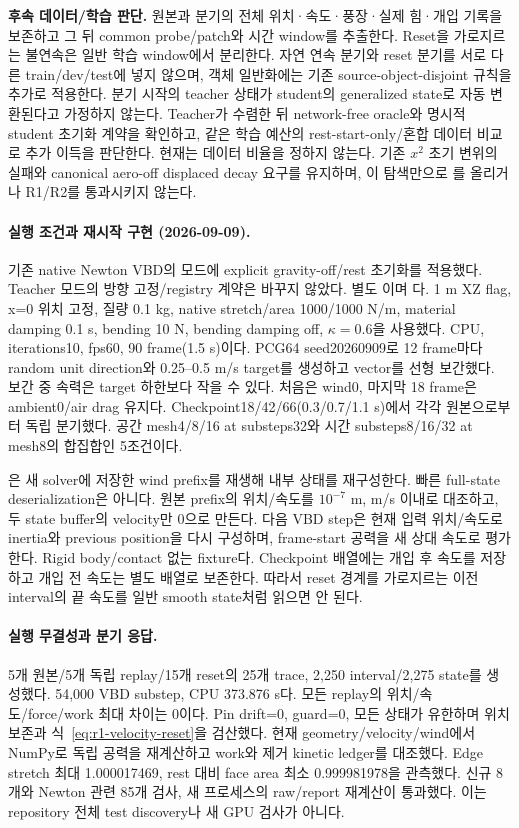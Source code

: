 \documentclass[10pt]{article}
\begin{document}
\textbf{후속 데이터/학습 판단.} 원본과 분기의 전체 위치·속도·풍장·실제 힘·개입 기록을 보존하고
그 뒤 common probe/patch와 시간 window를 추출한다. Reset을 가로지르는 불연속은 일반 학습 window에서
분리한다. 자연 연속 분기와 reset 분기를 서로 다른 train/dev/test에 넣지 않으며,
객체 일반화에는 기존 source-object-disjoint 규칙을 추가로 적용한다.
분기 시작의 teacher 상태가 student의 generalized state로 자동 변환된다고 가정하지 않는다.
Teacher가 수렴한 뒤 network-free oracle와 명시적 student 초기화 계약을 확인하고,
같은 학습 예산의 rest-start-only/혼합 데이터 비교로 추가 이득을 판단한다. 현재는 데이터 비율을 정하지 않는다.
기존 \(x^2\) 초기 변위의 실패와 canonical aero-off displaced decay 요구를 유지하며,
이 탐색만으로 를 올리거나 R1/R2를 통과시키지 않는다.


\paragraph{실행 조건과 재시작 구현 (2026-09-09).}
기존 native Newton VBD의  모드에 explicit gravity-off/rest 초기화를 적용했다.
Teacher 모드의 방향 고정/registry 계약은 바꾸지 않았다. 별도
이며 다.
1 m XZ flag, x=0 위치 고정, 질량 0.1 kg, native stretch/area 1000/1000 N/m,
material damping 0.1 s, bending 10 N, bending damping off, \(\kappa=0.6\)을 사용했다.
CPU, iterations10, fps60, 90 frame(1.5 s)이다. PCG64 seed20260909로 12 frame마다
random unit direction와 0.25--0.5 m/s target를 생성하고 vector를 선형 보간했다.
보간 중 속력은 target 하한보다 작을 수 있다. 처음은 wind0, 마지막 18 frame은 ambient0/air drag 유지다.
Checkpoint18/42/66(0.3/0.7/1.1 s)에서 각각 원본으로부터 독립 분기했다.
공간 mesh4/8/16 at substeps32와 시간 substeps8/16/32 at mesh8의 합집합인 5조건이다.

은 새 solver에 저장한 wind prefix를 재생해 내부 상태를 재구성한다.
빠른 full-state deserialization은 아니다. 원본 prefix의 위치/속도를 \(10^{-7}\) m, m/s 이내로 대조하고,
두 state buffer의 velocity만 0으로 만든다. 다음 VBD step은 현재 입력 위치/속도로 inertia와 previous
position을 다시 구성하며, frame-start 공력을 새 상대 속도로 평가한다. Rigid body/contact 없는 fixture다.
Checkpoint 배열에는 개입 후 속도를 저장하고 개입 전 속도는 별도 배열로 보존한다.
따라서 reset 경계를 가로지르는 이전 interval의 끝 속도를 일반 smooth state처럼 읽으면 안 된다.

\paragraph{실행 무결성과 분기 응답.}
5개 원본/5개 독립 replay/15개 reset의 25개 trace, 2,250 interval/2,275 state를 생성했다.
54,000 VBD substep, CPU 373.876 s다. 모든 replay의 위치/속도/force/work 최대 차이는 0이다.
Pin drift=0, guard=0, 모든 상태가 유한하며 위치 보존과 식~\eqref{eq:r1-velocity-reset}을 검산했다.
현재 geometry/velocity/wind에서 NumPy로 독립 공력을 재계산하고 work와 제거 kinetic ledger를 대조했다.
Edge stretch 최대 1.000017469, rest 대비 face area 최소 0.999981978을 관측했다.
신규 8개와 Newton 관련 85개 검사, 새 프로세스의 raw/report 재계산이 통과했다.
이는 repository 전체 test discovery나 새 GPU 검사가 아니다.
\end{document}
